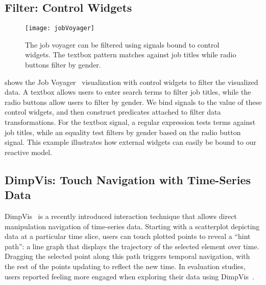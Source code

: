 \vspace{-10pt}

\subsection{Filter: Control Widgets}

\vspace{-7pt}

\begin{figure}[t!]
  \centering
  \texttt{[image: jobVoyager]}
  \caption{The job voyager can be filtered using signals bound to control
  widgets. The textbox pattern matches against job titles while radio buttons
  filter by gender.}
  \label{fig:vg:jobVoyager}
\end{figure}

 shows the Job Voyager~\cite{heer:voyagers}
visualization with control widgets to filter the visualized data. A textbox
allows users to enter search terms to filter job titles, while the radio buttons
allow users to filter by gender. We bind signals to the value of these control
widgets, and then construct predicates attached to filter data transformations.
For the textbox signal, a regular expression tests terms against job titles,
while an equality test filters by gender based on the radio button signal. This
example illustrates how external widgets can easily be bound to our reactive
model.

\vspace{-20pt}

\subsection{DimpVis: Touch Navigation with Time-Series Data}

\vspace{-7pt}

DimpVis~\cite{kondo:dimpvis} is a recently introduced interaction technique that
allows direct manipulation navigation of time-series data. Starting with a
scatterplot depicting data at a particular time slice, users can touch plotted
points to reveal a ``hint path'': a line graph that displays the trajectory of
the selected element over time. Dragging the selected point along this path
triggers temporal navigation, with the rest of the points updating to reflect
the new time. In evaluation studies, users reported feeling more engaged when
exploring their data using DimpVis~\cite{kondo:dimpvis}.

